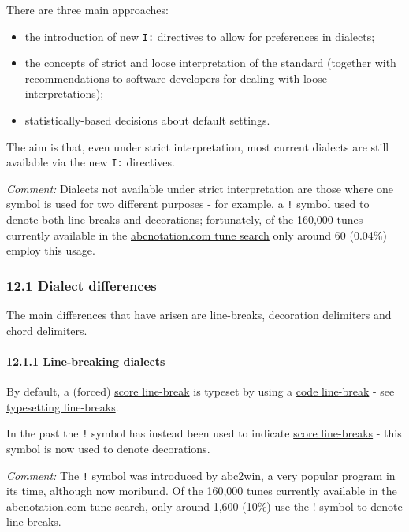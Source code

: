 There are three main approaches:

\begin{itemize}
\item
  the introduction of new \texttt{I:} directives to allow for
  preferences in dialects;
\item
  the concepts of strict and loose interpretation of the standard
  (together with recommendations to software developers for dealing with
  loose interpretations);
\item
  statistically-based decisions about default settings.
\end{itemize}

The aim is that, even under strict interpretation, most current dialects
are still available via the new \texttt{I:} directives.

\emph{Comment:} Dialects not available under strict interpretation are
those where one symbol is used for two different purposes - for example,
a \texttt{!} symbol used to denote both line-breaks and decorations;
fortunately, of the 160,000 tunes currently available in the
\href{http://abcnotation.com/search}{abcnotation.com tune search} only
around 60 (0.04\%) employ this usage.

\hypertarget{dialect_differences}{\subsubsection{12.1 Dialect
differences}\label{dialect_differences}}

The main differences that have arisen are line-breaks, decoration
delimiters and chord delimiters.

\hypertarget{line-breaking_dialects}{\paragraph{12.1.1 Line-breaking
dialects}\label{line-breaking_dialects}}

By default, a (forced)
\protect\hyperlink{score_line-break_definition}{score line-break} is
typeset by using a \protect\hyperlink{code_line-break_definition}{code
line-break} - see
\protect\hyperlink{typesetting_line-breaks}{typesetting line-breaks}.

In the past the \texttt{!} symbol has instead been used to indicate
\protect\hyperlink{score_line-break_definition}{score line-breaks} -
this symbol is now used to denote decorations.

\emph{Comment:} The \texttt{!} symbol was introduced by abc2win, a very
popular program in its time, although now moribund. Of the 160,000 tunes
currently available in the
\href{http://abcnotation.com/search}{abcnotation.com tune search}, only
around 1,600 (10\%) use the ! symbol to denote line-breaks.

